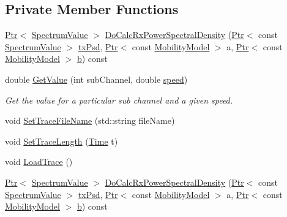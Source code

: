 \subsection*{Private Member Functions}
\begin{DoxyCompactItemize}
\item 
\hyperlink{classns3_1_1Ptr}{Ptr}$<$ \hyperlink{classns3_1_1SpectrumValue}{Spectrum\+Value} $>$ \hyperlink{classns3_1_1TraceFadingLossModel_ae7ce6b9691f0e0c0607c01ca2e9c7fa6}{Do\+Calc\+Rx\+Power\+Spectral\+Density} (\hyperlink{classns3_1_1Ptr}{Ptr}$<$ const \hyperlink{classns3_1_1SpectrumValue}{Spectrum\+Value} $>$ \hyperlink{lte__link__budget__x2__handover__measures_8m_a684fe3101a5e48a5fcc57cab8dbcd1aa}{tx\+Psd}, \hyperlink{classns3_1_1Ptr}{Ptr}$<$ const \hyperlink{classns3_1_1MobilityModel}{Mobility\+Model} $>$ a, \hyperlink{classns3_1_1Ptr}{Ptr}$<$ const \hyperlink{classns3_1_1MobilityModel}{Mobility\+Model} $>$ \hyperlink{lte__pathloss_8m_a21ad0bd836b90d08f4cf640b4c298e7c}{b}) const 
\item 
double \hyperlink{classns3_1_1TraceFadingLossModel_a45f36bd1be9f2a8a17b7686079e8da0d}{Get\+Value} (int sub\+Channel, double \hyperlink{mmwave-amc-test_8cc_a6dc6e6f3c75c509ce943163afb5dade7}{speed})
\begin{DoxyCompactList}\small\item\em Get the value for a particular sub channel and a given speed. \end{DoxyCompactList}\item 
void \hyperlink{classns3_1_1TraceFadingLossModel_a9e1847bc39afa49d2eb1928b86f6caa1}{Set\+Trace\+File\+Name} (std\+::string file\+Name)
\item 
void \hyperlink{classns3_1_1TraceFadingLossModel_a4205edb5c856c3c54324a622d3b37bc4}{Set\+Trace\+Length} (\hyperlink{classns3_1_1Time}{Time} t)
\item 
void \hyperlink{classns3_1_1TraceFadingLossModel_acc7f5b8fcb432e4ce8eca85464d42b07}{Load\+Trace} ()
\item 
\hyperlink{classns3_1_1Ptr}{Ptr}$<$ \hyperlink{classns3_1_1SpectrumValue}{Spectrum\+Value} $>$ \hyperlink{classns3_1_1TraceFadingLossModel_ab99a311996bf0959fa24f94c0774a4d6}{Do\+Calc\+Rx\+Power\+Spectral\+Density} (\hyperlink{classns3_1_1Ptr}{Ptr}$<$ const \hyperlink{classns3_1_1SpectrumValue}{Spectrum\+Value} $>$ \hyperlink{lte__link__budget__x2__handover__measures_8m_a684fe3101a5e48a5fcc57cab8dbcd1aa}{tx\+Psd}, \hyperlink{classns3_1_1Ptr}{Ptr}$<$ const \hyperlink{classns3_1_1MobilityModel}{Mobility\+Model} $>$ a, \hyperlink{classns3_1_1Ptr}{Ptr}$<$ const \hyperlink{classns3_1_1MobilityModel}{Mobility\+Model} $>$ \hyperlink{lte__pathloss_8m_a21ad0bd836b90d08f4cf640b4c298e7c}{b}) const 

\end{DoxyCompactItemize}
